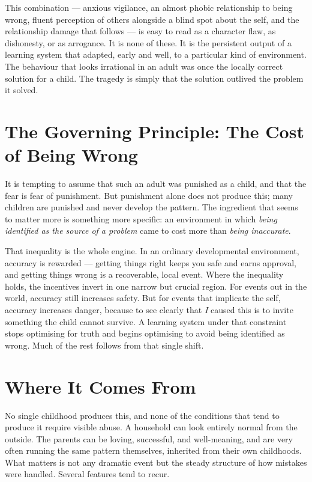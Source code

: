 \documentclass{article}
\begin{document}
This combination --- anxious vigilance, an almost phobic relationship to being wrong, fluent perception of others alongside a blind spot about the self, and the relationship damage that follows --- is easy to read as a character flaw, as dishonesty, or as arrogance. It is none of these. It is the persistent output of a learning system that adapted, early and well, to a particular kind of environment. The behaviour that looks irrational in an adult was once the locally correct solution for a child. The tragedy is simply that the solution outlived the problem it solved.

\section*{The Governing Principle: The Cost of Being Wrong}

It is tempting to assume that such an adult was punished as a child, and that the fear is fear of punishment. But punishment alone does not produce this; many children are punished and never develop the pattern. The ingredient that seems to matter more is something more specific: an environment in which \textit{being identified as the source of a problem} came to cost more than \textit{being inaccurate}.

That inequality is the whole engine. In an ordinary developmental environment, accuracy is rewarded --- getting things right keeps you safe and earns approval, and getting things wrong is a recoverable, local event. Where the inequality holds, the incentives invert in one narrow but crucial region. For events out in the world, accuracy still increases safety. But for events that implicate the self, accuracy increases danger, because to see clearly that \textit{I} caused this is to invite something the child cannot survive. A learning system under that constraint stops optimising for truth and begins optimising to avoid being identified as wrong. Much of the rest follows from that single shift.

\section*{Where It Comes From}

No single childhood produces this, and none of the conditions that tend to produce it require visible abuse. A household can look entirely normal from the outside. The parents can be loving, successful, and well-meaning, and are very often running the same pattern themselves, inherited from their own childhoods. What matters is not any dramatic event but the steady structure of how mistakes were handled. Several features tend to recur.
\end{document}
